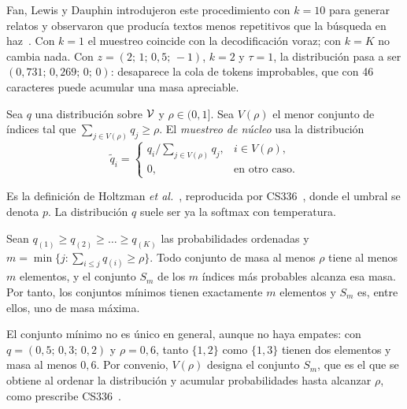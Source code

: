 Fan, Lewis y Dauphin introdujeron este procedimiento con $k=10$ para generar relatos y observaron que producía textos menos repetitivos que la búsqueda en haz~\cite[§5.4]{fan}. Con $k=1$ el muestreo coincide con la decodificación voraz; con $k=K$ no cambia nada. Con $z=(2;\allowbreak\,1;\allowbreak\,0{,}5;\allowbreak\,-1)$, $k=2$ y $\tau=1$, la distribución pasa a ser $(0{,}731;\allowbreak\,0{,}269;\allowbreak\,0;\allowbreak\,0)$: desaparece la cola de tokens improbables, que con 46 caracteres puede acumular una masa apreciable.

\begin{definicion}\label{def:topp}
Sea $q$ una distribución sobre $\mathcal{V}$ y $\rho\in(0,1]$. Sea $V(\rho)$ el menor conjunto de índices tal que $\sum_{j\in V(\rho)}q_j\ge\rho$. El \emph{muestreo de núcleo} usa la distribución
\[
\tilde q_i=\begin{cases} q_i\big/\sum_{j\in V(\rho)}q_j, & i\in V(\rho),\\ 0, & \text{en otro caso}.\end{cases}
\]
\end{definicion}

Es la definición de Holtzman \emph{et al.}~\cite[§3.1, ecuaciones~(2) y~(3)]{holtzman}, reproducida por CS336~\cite[§6, ecuación~(24)]{cs336}, donde el umbral se denota $p$. La distribución $q$ suele ser ya la softmax con temperatura.

\begin{proposicion}\label{prop:nucleo}
Sean $q_{(1)}\ge q_{(2)}\ge\dots\ge q_{(K)}$ las probabilidades ordenadas y $m=\min\{j:\sum_{i\le j}q_{(i)}\ge\rho\}$. Todo conjunto de masa al menos $\rho$ tiene al menos $m$ elementos, y el conjunto $S_m$ de los $m$ índices más probables alcanza esa masa. Por tanto, los conjuntos mínimos tienen exactamente $m$ elementos y $S_m$ es, entre ellos, uno de masa máxima.
\end{proposicion}

\begin{observacion}\label{obs:nucleo}
El conjunto mínimo no es único en general, aunque no haya empates: con $q=(0{,}5;\allowbreak\,0{,}3;\allowbreak\,0{,}2)$ y $\rho=0{,}6$, tanto $\{1,2\}$ como $\{1,3\}$ tienen dos elementos y masa al menos $0{,}6$. Por convenio, $V(\rho)$ designa el conjunto $S_m$, que es el que se obtiene al ordenar la distribución y acumular probabilidades hasta alcanzar $\rho$, como prescribe CS336~\cite[§6]{cs336}.
\end{observacion}

